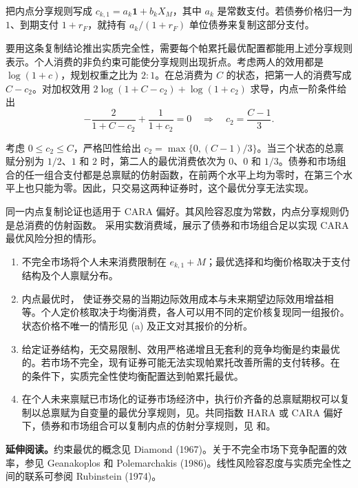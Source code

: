 把内点分享规则写成 $c_{k,1}=a_k\mathbf1+b_kX_M$，其中 $a_k$ 是常数支付。若债券价格归一为 $1$、到期支付 $1+r_F$，就持有 $a_k/(1+r_F)$ 单位债券来复制这部分支付。

要用这条复制结论推出实质完全性，需要每个帕累托最优配置都能用上述分享规则表示。个人消费的非负约束可能使分享规则出现折点。考虑两人的效用都是 $\log(1+c)$，规划权重之比为 $2:1$。在总消费为 $C$ 的状态，把第一人的消费写成 $C-c_2$。对加权效用 $2\log(1+C-c_2)+\log(1+c_2)$ 求导，内点一阶条件给出
\[
 -\frac{2}{1+C-c_2}+\frac{1}{1+c_2}=0
 \quad\Longrightarrow\quad c_2=\frac{C-1}{3}.
\]

考虑 $0\le c_2\le C$，严格凹性给出 $c_2=\max\{0,(C-1)/3\}$。当三个状态的总禀赋分别为 $1/2$、$1$ 和 $2$ 时，第二人的最优消费依次为 $0$、$0$ 和 $1/3$。债券和市场组合的任一组合支付都是总禀赋的仿射函数，在前两个水平上均为零时，在第三个水平上也只能为零。因此，只交易这两种证券时，这个最优分享无法实现。

同一内点复制论证也适用于 CARA 偏好。其风险容忍度为常数，内点分享规则仍是总消费的仿射函数。 采用实数消费域，展示了债券和市场组合足以实现 CARA 最优风险分担的情形。

\WJChapterSummary
\begin{tcolorbox}[summary]
\begin{enumerate}
 \item 不完全市场将个人未来消费限制在 $e_{k,1}+M$；最优选择和均衡价格取决于支付结构及个人禀赋分布。
 \item 内点最优时， 使证券交易的当期边际效用成本与未来期望边际效用增益相等。个人定价核取决于均衡消费，各人可以用不同的定价核复现同一组报价。状态价格不唯一的情形见 (a) 及正文对其报价的分析。
 \item 给定证券结构，无交易限制、效用严格递增且无套利的竞争均衡是约束最优的。若市场不完全，现有证券可能无法实现帕累托改善所需的支付转移。在 的条件下，实质完全性使均衡配置达到帕累托最优。
 \item 在个人未来禀赋已市场化的证券市场经济中，执行价齐备的总禀赋期权可以复制以总禀赋为自变量的最优分享规则，见。共同指数 HARA 或 CARA 偏好下，债券和市场组合可以复制内点的仿射分享规则，见 和。
\end{enumerate}
\end{tcolorbox}

\textbf{延伸阅读。}约束最优的概念见 Diamond (1967)。关于不完全市场下竞争配置的效率，参见 Geanakoplos 和 Polemarchakis (1986)。线性风险容忍度与实质完全性之间的联系可参阅 Rubinstein (1974)。
\fi

\WJChapterExercises

\endgroup
